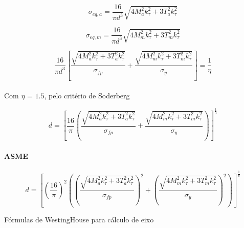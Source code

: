 \[\sigma _{eq,a}=\frac{16}{\pi d^{3}}\sqrt{4M_{a}^{2}k_{\tau}^{2}+3T_{a}^{2}k_{\tau}^{2}}\]

\[\sigma _{eq,m}=\frac{16}{\pi d^{3}}\sqrt{4M_{m}^{2}k_{\tau}^{2}+3T_{m}^{2}k_{\tau}^{2}}\]

\[\frac{16}{\pi d^{3}}\left[\frac{ \sqrt{4M_{a}^{2}k_{\tau}^{2}+3T_{a}^{2}k_{\tau}^{2}}}{\sigma _{fp}}  +  \frac{\sqrt{4M_{m}^{2}k_{\tau}^{2}+3T_{m}^{2}k_{\tau}^{2}}}{\sigma _{y}} \right] = \frac{1}{\eta}\]
\\

Com $\eta$ = $1.5$, pelo critério de Soderberg

\[d = \left[\frac{16}{\pi }\left(\frac{ \sqrt{4M_{a}^{2}k_{\tau}^{2}+3T_{a}^{2}k_{\tau}^{2}}}{\sigma _{fp}}  +  \frac{\sqrt{4M_{m}^{2}k_{\tau}^{2}+3T_{m}^{2}k_{\tau}^{2}}}{\sigma _{y}} \right)\right]^{\frac{1}{3}}\]

\paragraph*{ASME}
\[d = \left[\left( \frac{16}{\pi } \right)^{2} \left(  \left( \frac{ \sqrt{4M_{a}^{2}k_{\tau}^{2}+3T_{a}^{2}k_{\tau}^{2}}}{\sigma _{fp}} \right)^{2}  +  \left( \frac{\sqrt{4M_{m}^{2}k_{\tau}^{2}+3T_{m}^{2}k_{\tau}^{2}}}{\sigma _{y}} \right)^{2}  \right)\right]^{\frac{1}{6}}\]

Fórmulas de WestingHouse para cálculo de eixo